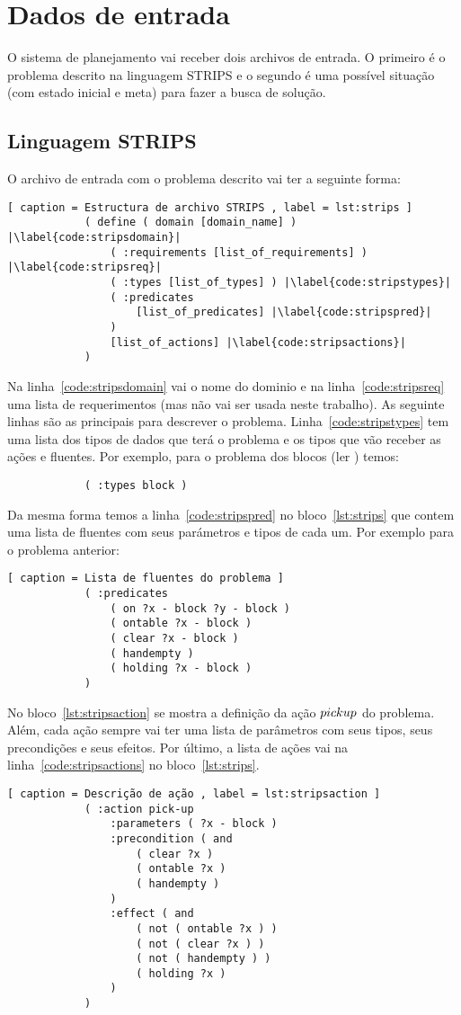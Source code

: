 \section{Dados de entrada}

O sistema de planejamento vai receber dois archivos de entrada. O primeiro é o problema descrito na linguagem STRIPS e o segundo é uma possível situação (com estado inicial e meta) para fazer a busca de solução.

\subsection{Linguagem STRIPS}
\label{subsec:strips}
	O archivo de entrada com o problema descrito vai ter a seguinte forma: \\
		\begin{lstlisting}[ caption = Estructura de archivo STRIPS , label = lst:strips ]
			( define ( domain [domain_name] ) |\label{code:stripsdomain}|
				( :requirements [list_of_requirements] ) |\label{code:stripsreq}|
				( :types [list_of_types] ) |\label{code:stripstypes}|
				( :predicates
					[list_of_predicates] |\label{code:stripspred}|
				)
				[list_of_actions] |\label{code:stripsactions}|
			)
		\end{lstlisting}
	Na linha~\ref{code:stripsdomain} vai o nome do dominio e na linha~\ref{code:stripsreq} uma lista de requerimentos (mas não vai ser usada neste trabalho). As seguinte linhas são as principais para descrever o problema.
	Linha~\ref{code:stripstypes} tem uma lista dos tipos de dados que terá o problema e os tipos que vão receber as ações e fluentes. Por exemplo, para o problema dos blocos (ler \cite{USPLeliane15}) temos:
		\begin{lstlisting}
			( :types block )
		\end{lstlisting}
	Da mesma forma temos a linha~\ref{code:stripspred} no bloco~\ref{lst:strips} que contem uma lista de fluentes com seus parámetros e tipos de cada um. Por exemplo para o problema anterior:
		\begin{lstlisting}[ caption = Lista de fluentes do problema ]
			( :predicates
				( on ?x - block ?y - block )
				( ontable ?x - block )
				( clear ?x - block )
				( handempty )
				( holding ?x - block )
			)
		\end{lstlisting}
	No bloco~\ref{lst:stripsaction} se mostra a definição da ação ${pick\-up}$ do problema. Além, cada ação sempre vai ter uma lista de parâmetros com seus tipos, seus precondições e seus efeitos. Por último, a lista de ações vai na linha~\ref{code:stripsactions} no bloco~\ref{lst:strips}.
		\begin{lstlisting}[ caption = Descrição de ação , label = lst:stripsaction ]
			( :action pick-up
				:parameters ( ?x - block )
				:precondition ( and
					( clear ?x )
					( ontable ?x )
					( handempty )
				)
				:effect ( and
					( not ( ontable ?x ) )
					( not ( clear ?x ) )
					( not ( handempty ) )
					( holding ?x )
				)
			)
		\end{lstlisting}
	
